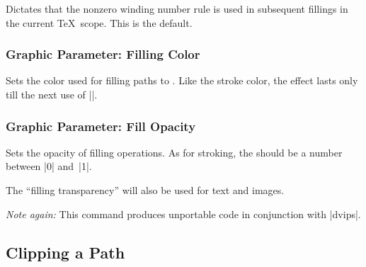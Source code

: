 \begin{command}{\pgfsetnonzerorule}
  Dictates that the nonzero winding number rule is used in subsequent
  fillings in the current \TeX\ scope. This is the default.

\begin{codeexample}[]
\begin{pgfpicture}
  \pgfsetnonzerorule
  \pgfpathcircle{\pgfpoint{0mm}{0cm}}{7mm}
  \pgfpathcircle{\pgfpoint{5mm}{0cm}}{7mm}
\end{pgfpicture}
\end{codeexample}
\end{command}

\subsubsection{Graphic Parameter: Filling Color}

\begin{command}{\pgfsetfillcolor{}}
  Sets the color used for filling paths to . Like the
  stroke color, the effect lasts only till the next use of |\color|. 
\end{command}


\subsubsection{Graphic Parameter: Fill Opacity}

\begin{command}{\pgfsetfillopacity{}}
  Sets the opacity of filling operations. As for stroking, the
   should be a number between |0| and~|1|.

  The ``filling transparency'' will also be used for text and images.  
  
  \emph{Note again:} This command produces unportable code in
  conjunction with |dvips|.
  
\begin{codeexample}[]
\end{codeexample}
\end{command}

\subsection{Clipping a Path}
\label{section-clip}

